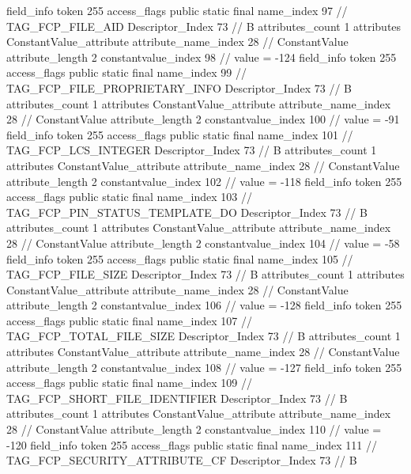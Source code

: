 {{{{{{{				}
				}
			}
			field_info {
				token	255
				access_flags	public static final
				name_index	97		// TAG_FCP_FILE_AID
				Descriptor_Index	73		// B
				attributes_count	1
				attributes {
				ConstantValue_attribute {
					attribute_name_index	28		// ConstantValue
					attribute_length	2
					constantvalue_index	98		// value = -124
				}
				}
			}
			field_info {
				token	255
				access_flags	public static final
				name_index	99		// TAG_FCP_FILE_PROPRIETARY_INFO
				Descriptor_Index	73		// B
				attributes_count	1
				attributes {
				ConstantValue_attribute {
					attribute_name_index	28		// ConstantValue
					attribute_length	2
					constantvalue_index	100		// value = -91
				}
				}
			}
			field_info {
				token	255
				access_flags	public static final
				name_index	101		// TAG_FCP_LCS_INTEGER
				Descriptor_Index	73		// B
				attributes_count	1
				attributes {
				ConstantValue_attribute {
					attribute_name_index	28		// ConstantValue
					attribute_length	2
					constantvalue_index	102		// value = -118
				}
				}
			}
			field_info {
				token	255
				access_flags	public static final
				name_index	103		// TAG_FCP_PIN_STATUS_TEMPLATE_DO
				Descriptor_Index	73		// B
				attributes_count	1
				attributes {
				ConstantValue_attribute {
					attribute_name_index	28		// ConstantValue
					attribute_length	2
					constantvalue_index	104		// value = -58
				}
				}
			}
			field_info {
				token	255
				access_flags	public static final
				name_index	105		// TAG_FCP_FILE_SIZE
				Descriptor_Index	73		// B
				attributes_count	1
				attributes {
				ConstantValue_attribute {
					attribute_name_index	28		// ConstantValue
					attribute_length	2
					constantvalue_index	106		// value = -128
				}
				}
			}
			field_info {
				token	255
				access_flags	public static final
				name_index	107		// TAG_FCP_TOTAL_FILE_SIZE
				Descriptor_Index	73		// B
				attributes_count	1
				attributes {
				ConstantValue_attribute {
					attribute_name_index	28		// ConstantValue
					attribute_length	2
					constantvalue_index	108		// value = -127
				}
				}
			}
			field_info {
				token	255
				access_flags	public static final
				name_index	109		// TAG_FCP_SHORT_FILE_IDENTIFIER
				Descriptor_Index	73		// B
				attributes_count	1
				attributes {
				ConstantValue_attribute {
					attribute_name_index	28		// ConstantValue
					attribute_length	2
					constantvalue_index	110		// value = -120
				}
				}
			}
			field_info {
				token	255
				access_flags	public static final
				name_index	111		// TAG_FCP_SECURITY_ATTRIBUTE_CF
				Descriptor_Index	73		// B
}}}}}
